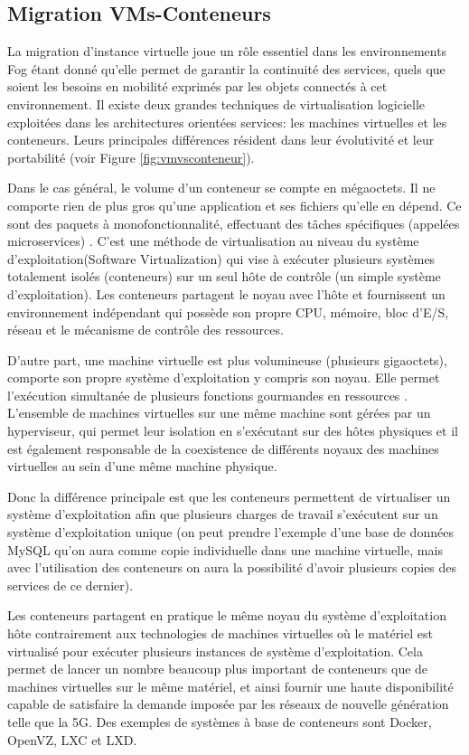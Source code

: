 \subsection{Migration VMs-Conteneurs}
La migration d'instance virtuelle joue un rôle essentiel dans les environnements Fog étant donné qu'elle permet de garantir la continuité des services, quels que soient les besoins en mobilité exprimés par les objets connectés à cet environnement.
Il existe deux grandes techniques de virtualisation logicielle exploitées dans les architectures orientées services: les machines virtuelles et les conteneurs. Leurs principales différences résident dans leur évolutivité et leur portabilité \cite{redhat} (voir Figure \ref{fig:vmvsconteneur}).\par
Dans le cas général, le volume d'un conteneur se compte en mégaoctets. Il ne comporte rien de plus gros qu'une application et ses fichiers qu'elle en dépend. Ce sont des paquets à monofonctionnalité, effectuant des tâches spécifiques (appelées microservices) \cite{redhat}. C'est une méthode de virtualisation au niveau du système d'exploitation(Software Virtualization) qui vise à exécuter plusieurs systèmes totalement isolés (conteneurs) sur un seul hôte de contrôle (un simple système d'exploitation). Les conteneurs partagent le noyau avec l'hôte et fournissent un environnement indépendant qui possède son propre CPU, mémoire, bloc d'E/S, réseau et le mécanisme de contrôle des ressources.\par
D'autre part, une machine virtuelle est plus volumineuse (plusieurs gigaoctets), comporte son propre système d'exploitation y compris son noyau. Elle permet l'exécution simultanée de plusieurs fonctions gourmandes en ressources \cite{microsoft2019}. L'ensemble de machines virtuelles sur une même machine sont gérées par un hyperviseur, qui permet leur isolation en s'exécutant sur des hôtes physiques et il est également responsable de la coexistence de différents noyaux des machines virtuelles au sein d'une même machine physique.\par
Donc la différence principale est que les conteneurs permettent de virtualiser un système d'exploitation afin que plusieurs charges de travail s'exécutent sur un système d'exploitation unique (on peut prendre l'exemple d'une base de données MySQL qu'on aura comme copie individuelle dans une machine virtuelle, mais avec l'utilisation des conteneurs on aura la possibilité d'avoir plusieurs copies des services de ce dernier).\par
Les conteneurs partagent en pratique le même noyau du système d'exploitation hôte contrairement aux technologies de machines virtuelles où le matériel est virtualisé pour exécuter plusieurs instances de système d'exploitation. Cela permet de lancer un nombre beaucoup plus important de conteneurs que de machines virtuelles sur le même matériel, et ainsi fournir une haute disponibilité capable de satisfaire la demande imposée par les réseaux de nouvelle génération telle que la 5G. Des exemples de systèmes à base de conteneurs sont Docker, OpenVZ, LXC et LXD. 
